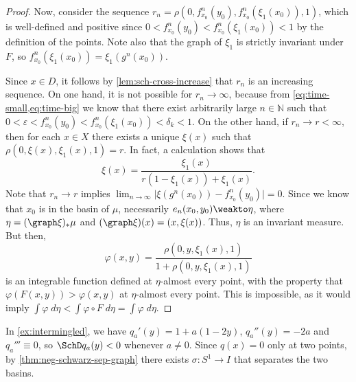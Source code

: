 \documentclass[../main]{subfiles}
\begin{document}
\begin{proof}
  Now, consider the sequence \(r_n = \rho(0, f_{x_0}^n(y_0), f_{x_0}^n(\xi_1(x_0)), 1)\), which is well-defined and positive since \(0 < f_{x_0}^n(y_0) < f_{x_0}^n(\xi_1(x_0)) < 1\) by the definition of the points. Note also that the graph of \(\xi_1\) is strictly invariant under \(F\), so \(f_{x_0}^n(\xi_1(x_0)) = \xi_1(g^n(x_0))\).

  Since \(x \in D\), it follows by \cref{lem:sch-cross-increase} that \(r_n\) is an increasing sequence. On one hand, it is not possible for \(r_n \to \infty\), because from \cref{eq:time-small,eq:time-big} we know that there exist arbitrarily large \(n \in \mathbb{N}\) such that \(0 < \varepsilon < f^n_{x_0}(y_0) < f^n_{x_0}(\xi_1(x_0)) < \delta_k < 1\). On the other hand, if \(r_n \to r < \infty\), then for each \(x \in X\) there exists a unique \(\xi(x)\) such that \(\rho(0, \xi(x), \xi_1(x), 1) = r\). In fact, a calculation shows that
  \begin{equation*}
    \xi(x) = \frac{\xi_1(x)}{r(1 - \xi_1(x)) + \xi_1(x)}.
  \end{equation*}
  Note that \(r_n \to r\) implies \(\lim_{n \to \infty} \lvert \xi(g^n(x_0)) - f_{x_0}^n(y_0) \rvert = 0\). Since we know that \(x_0\) is in the basin of \(\mu\), necessarily \(e_n(x_0,y_0)\weakto \eta\), where \(\eta = (\graph \xi)_* \mu\) and \((\graph \xi)(x) = (x, \xi(x))\). Thus, \(\eta\) is an invariant measure. But then,
  \[\varphi(x,y) = \frac{\rho(0, y, \xi_1(x), 1)}{1 + \rho(0, y, \xi_1(x), 1)}\]
  is an integrable function defined at \(\eta\)-almost every point, with the property that \(\varphi(F(x,y)) > \varphi(x,y)\) at \(\eta\)-almost every point. This is impossible, as it would imply \(\int \varphi \;d \eta < \int \varphi \circ F \;d\eta = \int \varphi \;d\eta\).
\end{proof}

\begin{example}
  In \cref{ex:intermingled}, we have \(q_a'(y) = 1 + a(1 - 2y)\), \(q_a''(y) = -2a\) and \(q_a''' \equiv 0\), so \(\SchD q_a(y) < 0\) whenever \(a \neq 0\). Since \(q(x) = 0\) only at two points, by \cref{thm:neg-schwarz-sep-graph} there exists \(\sigma \colon S^1 \to I\) that separates the two basins.
\end{example}


\end{document}
